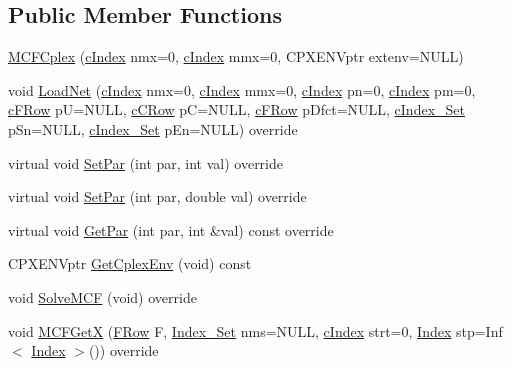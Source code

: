 \subsection*{Public Member Functions}
\begin{DoxyCompactItemize}
\item 
\mbox{\hyperlink{class_m_c_f_cplex_a3f1c63740c3795cfc6ce75c3067c5561}{M\+C\+F\+Cplex}} (\mbox{\hyperlink{class_m_c_f_class_a76aaabb20535c51a2752b93f6c38fe54}{c\+Index}} nmx=0, \mbox{\hyperlink{class_m_c_f_class_a76aaabb20535c51a2752b93f6c38fe54}{c\+Index}} mmx=0, C\+P\+X\+E\+N\+Vptr extenv=N\+U\+LL)
\item 
void \mbox{\hyperlink{class_m_c_f_cplex_ac270d18d58fd6fe88164cde1f4c80aff}{Load\+Net}} (\mbox{\hyperlink{class_m_c_f_class_a76aaabb20535c51a2752b93f6c38fe54}{c\+Index}} nmx=0, \mbox{\hyperlink{class_m_c_f_class_a76aaabb20535c51a2752b93f6c38fe54}{c\+Index}} mmx=0, \mbox{\hyperlink{class_m_c_f_class_a76aaabb20535c51a2752b93f6c38fe54}{c\+Index}} pn=0, \mbox{\hyperlink{class_m_c_f_class_a76aaabb20535c51a2752b93f6c38fe54}{c\+Index}} pm=0, \mbox{\hyperlink{class_m_c_f_class_ad325f3193dbba0ddef1da4e72d29eda6}{c\+F\+Row}} pU=N\+U\+LL, \mbox{\hyperlink{class_m_c_f_class_ab700102e9ba8bb6015be6818d4e99097}{c\+C\+Row}} pC=N\+U\+LL, \mbox{\hyperlink{class_m_c_f_class_ad325f3193dbba0ddef1da4e72d29eda6}{c\+F\+Row}} p\+Dfct=N\+U\+LL, \mbox{\hyperlink{class_m_c_f_class_a81575b2d4e4d5636b17170432150ae69}{c\+Index\+\_\+\+Set}} p\+Sn=N\+U\+LL, \mbox{\hyperlink{class_m_c_f_class_a81575b2d4e4d5636b17170432150ae69}{c\+Index\+\_\+\+Set}} p\+En=N\+U\+LL) override
\item 
virtual void \mbox{\hyperlink{class_m_c_f_cplex_a12105bbd99b8b7ad7efae3bb0c222b3c}{Set\+Par}} (int par, int val) override
\item 
virtual void \mbox{\hyperlink{class_m_c_f_cplex_a64a55cf140fd8543ab0cf88cc052d8d7}{Set\+Par}} (int par, double val) override
\item 
virtual void \mbox{\hyperlink{class_m_c_f_cplex_aebb293732f2fd2767e9ebc5e8ccae338}{Get\+Par}} (int par, int \&val) const override
\item 
C\+P\+X\+E\+N\+Vptr \mbox{\hyperlink{class_m_c_f_cplex_a8d6c10adf2fc39afc2a49bebf57f141b}{Get\+Cplex\+Env}} (void) const
\item 
void \mbox{\hyperlink{class_m_c_f_cplex_aea7d742cb19c17b17fb0832ea74cdb21}{Solve\+M\+CF}} (void) override
\item 
void \mbox{\hyperlink{class_m_c_f_cplex_adfe83485d41648441446726b336069d1}{M\+C\+F\+GetX}} (\mbox{\hyperlink{class_m_c_f_class_a9dae1f1a39c208ce3c2b337cd5bb3d00}{F\+Row}} F, \mbox{\hyperlink{class_m_c_f_class_ace3388eb329ff0551a0b86b6c67e33d8}{Index\+\_\+\+Set}} nms=N\+U\+LL, \mbox{\hyperlink{class_m_c_f_class_a76aaabb20535c51a2752b93f6c38fe54}{c\+Index}} strt=0, \mbox{\hyperlink{class_m_c_f_class_ad53d6229d7ec28555a9c9c2fd9abf773}{Index}} stp=Inf$<$ \mbox{\hyperlink{class_m_c_f_class_ad53d6229d7ec28555a9c9c2fd9abf773}{Index}} $>$()) override

\end{DoxyCompactItemize}
